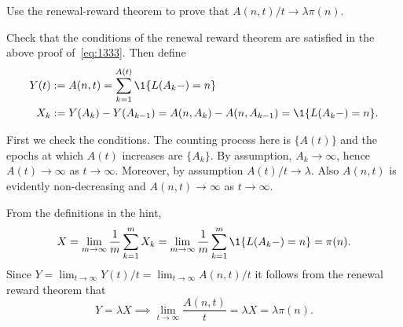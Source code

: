 \begin{exercise}\label{ex:18}
Use the renewal-reward theorem to prove that $A(n,t)/t \to \lambda \pi(n)$.
\begin{hint}
Check that the conditions of the renewal reward theorem are satisfied in the above proof of~\cref{eq:1333}. Then define 
\begin{align*}
 Y(t) &:= A(n,t) = \sum_{k=1}^{A(t)} \1{\L(A_k-) = n} \\
X_k &:= Y(A_k) - Y(A_{k-1}) = A(n, A_k) - A(n, A_{k-1}) = \1{\L(A_k-)=n}.
\end{align*}

\end{hint}
\begin{solution}
First we check the conditions. The counting process here is $\{A(t)\}$ and the epochs at which
 $A(t)$ increases are $\{A_k\}$. By assumption, $A_k\to\infty$,
 hence $A(t)\to\infty$ as $t\to\infty$. Moreover, by assumption
 $A(t)/t \to \lambda$. Also $A(n,t)$ is evidently non-decreasing and
 $A(n,t)\to\infty$ as $t\to\infty$.


From the definitions in the hint, 
\begin{equation*}
X= \lim_{m\to\infty} \frac 1 m \sum_{k=1}^m X_k =\lim_{m\to\infty} \frac 1 m \sum_{k=1}^m \1{\L(A_k-)=n} = \pi(n).
\end{equation*}
Since $Y=\lim_{t\to\infty} Y(t)/t = \lim_{t\to\infty} A(n,t)/t$ it follows from the renewal reward theorem that
\begin{equation*}
 Y=\lambda X \implies \lim_{t\to\infty} \frac{A(n,t)} t = \lambda X = \lambda \pi(n).
\end{equation*}
\end{solution}
\end{exercise}





